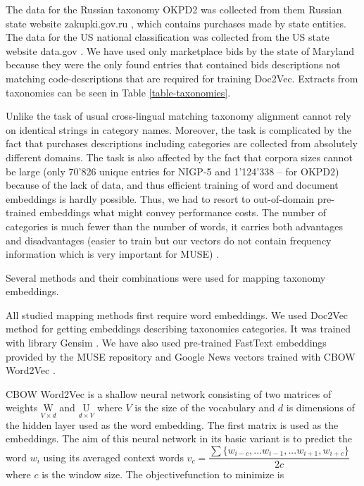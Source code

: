 \documentclass[conference]{IEEEtran}
\begin{document}
The data for the Russian taxonomy OKPD2 was collected from them Russian state website zakupki.gov.ru \cite{gos-zakupki}, which contains purchases made by state entities.
The data for the US national classification was collected from the US state website data.gov \cite{data-gov}. We have used only marketplace bids by the state of Maryland because they were the only found entries that contained bids descriptions not matching code-descriptions that are required for training Doc2Vec. Extracts from taxonomies can be seen in Table \ref{table-taxonomies}.

Unlike the task of usual cross-lingual matching taxonomy alignment cannot rely on identical strings in category names. Moreover, the task is complicated by the fact that purchases descriptions including categories are collected from absolutely different domains. The task is also affected by the fact that corpora sizes cannot be large (only 70'826 unique entries for NIGP-5 and 1'124'338 -- for OKPD2) because of the lack of data, and thus efficient training of word and document embeddings is hardly possible. Thus, we had to resort to out-of-domain pre-trained embeddings what might convey performance costs. The number of categories is much fewer than the number of words, it carries both advantages and disadvantages (easier to train but our vectors do not contain frequency information which is very important for MUSE) \cite{ruder-muse-limitations}.

Several methods and their combinations were used for mapping taxonomy embeddings.

All studied mapping methods first require word embeddings. We used Doc2Vec \cite{doc2vec} method for getting embeddings describing taxonomies categories. It was trained with library Gensim \cite{gensim}. We have also used pre-trained FastText \cite{fasttext} embeddings provided by the MUSE repository and Google News vectors trained with CBOW Word2Vec \cite{mikolov2013}. 

CBOW Word2Vec is a shallow neural network consisting of two matrices of weights $\underset{V\times d}{\mathrm{W}}$ and $\underset{d\times V}{\mathrm{U}}$ where $V$ is the size of the vocabulary and $d$ is dimensions of the hidden layer used as the word embedding.
The first matrix is used as the embeddings.
The aim of this neural network in its basic variant is to predict the word $w_i$ using its averaged context words $v_c = \dfrac{\sum\{w_{i-c},...w_{i-1},...w_{i+1}, w_{i+c}\}}{2c}$ where $c$ is the window size. The objective\quad function to minimize is
\end{document}
